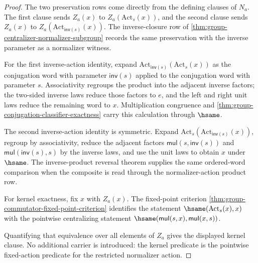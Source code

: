 \begin{proof}
The two preservation rows come directly from the defining clauses of $N_a$.
The first clause sends $Z_a(x)$ to $Z_a(\mathrm{Act}_s(x))$, and the second
clause sends $Z_a(x)$ to
$Z_a(\mathrm{Act}_{\mathsf{inv}(s)}(x))$. The inverse-closure row of
\autoref{thm:group-centralizer-normalizer-subgroup} records the same
preservation with the inverse parameter as a normalizer witness.

For the first inverse-action identity, expand
$\mathrm{Act}_{\mathsf{inv}(s)}(\mathrm{Act}_s(x))$ as the conjugation word
with parameter $\mathsf{inv}(s)$ applied to the conjugation word with parameter
$s$. Associativity regroups the product into the adjacent inverse factors;
the two-sided inverse laws reduce those factors to $e$, and the left and right
unit laws reduce the remaining word to $x$. Multiplication congruence and
\autoref{thm:group-conjugation-classifier-exactness} carry this calculation
through $\hsame$.

The second inverse-action identity is symmetric. Expand
$\mathrm{Act}_s(\mathrm{Act}_{\mathsf{inv}(s)}(x))$, regroup by
associativity, reduce the adjacent factors
$\mathsf{mul}(s,\mathsf{inv}(s))$ and
$\mathsf{mul}(\mathsf{inv}(s),s)$ by the inverse laws, and use the unit laws
to obtain $x$ under $\hsame$. The inverse-product reversal theorem supplies
the same ordered-word comparison when the composite is read through the
normalizer-action product row.

For kernel exactness, fix $x$ with $Z_a(x)$. The fixed-point criterion
\autoref{thm:group-commutator-fixed-point-criterion} identifies the statement
$\hsame(\mathrm{Act}_s(x),x)$ with the pointwise centralizing statement
$\hsame(\mathsf{mul}(s,x),\mathsf{mul}(x,s))$.

Quantifying that equivalence over all elements of $Z_a$ gives the displayed
kernel clause. No additional carrier is introduced: the kernel predicate is
the pointwise fixed-action predicate for the restricted normalizer action.
\end{proof}

